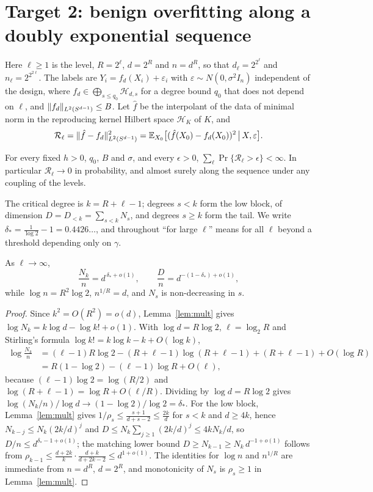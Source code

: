 \section{Target 2: benign overfitting along a doubly exponential sequence}\label{sec:proofT2}

Here $\ell\ge1$ is the level, $R=2^\ell$, $d=2^R$ and $n=d^R$, so that $d_\ell=2^{2^\ell}$ and
$n_\ell=2^{2^{2\ell}}$. The labels are $Y_i=f_d(X_i)+\varepsilon_i$ with $\varepsilon\sim N(0,\sigma^2I_n)$
independent of the design, where $f_d\in\bigoplus_{s\le q_0}\mathcal H_{d,s}$ for a degree bound $q_0$ that
does not depend on $\ell$, and $\|f_d\|_{L^2(S^{d-1})}\le B$. Let $\hat f$ be the interpolant of the data of
minimal norm in the reproducing kernel Hilbert space $\mathcal H_K$ of $K$, and
\[
\mathcal R_\ell=\|\hat f-f_d\|_{L^2(S^{d-1})}^2=\mathbb{E}_{X_0}\big[(\hat f(X_0)-f_d(X_0))^2\,\big|\,X,\varepsilon\big].
\]

\begin{theorem}[Target 2]\label{thm:T2}
For every fixed $h>0$, $q_0$, $B$ and $\sigma$, and every $\epsilon>0$, $\sum_\ell\Pr\{\mathcal R_\ell>\epsilon\}<\infty$.
In particular $\mathcal R_\ell\to0$ in probability, and almost surely along the sequence under any coupling of
the levels.
\end{theorem}

The critical degree is $k=R+\ell-1$; degrees $s<k$ form the low block, of dimension
$D=D_{<k}=\sum_{s<k}N_s$, and degrees $s\ge k$ form the tail. We write $\delta_*=\frac1{\log2}-1=0.4426\ldots$,
and throughout ``for large $\ell$'' means for all $\ell$ beyond a threshold depending only on $\gamma$.

\begin{lemma}\label{lem:scales}
As $\ell\to\infty$,
\[
\frac{N_k}{n}=d^{\,\delta_*+o(1)},\qquad \frac{D}{n}=d^{-(1-\delta_*)+o(1)},
\]
while $\log n=R^2\log2$, $n^{1/R}=d$, and $N_s$ is non-decreasing in $s$.
\end{lemma}

\begin{proof}
Since $k^2=O(R^2)=o(d)$, Lemma~\ref{lem:mult} gives $\log N_k=k\log d-\log k!+o(1)$. With
$\log d=R\log2$, $\ell=\log_2R$ and Stirling's formula $\log k!=k\log k-k+O(\log k)$,
\[
\begin{aligned}
\log\frac{N_k}{n}&=(\ell-1)R\log2-(R+\ell-1)\log(R+\ell-1)+(R+\ell-1)+O(\log R)\\
&=R(1-\log2)-(\ell-1)\log R+O(\ell),
\end{aligned}
\]
because $(\ell-1)\log2=\log(R/2)$ and $\log(R+\ell-1)=\log R+O(\ell/R)$. Dividing by $\log d=R\log2$
gives $\log(N_k/n)/\log d\to(1-\log2)/\log2=\delta_*$. For the low block, Lemma~\ref{lem:mult} gives
$1/\rho_s\le\frac{s+1}{d+s-2}\le\frac{2k}{d}$ for $s<k$ and $d\ge4k$, hence $N_{k-j}\le N_k(2k/d)^j$ and
$D\le N_k\sum_{j\ge1}(2k/d)^j\le4kN_k/d$, so $D/n\le d^{\delta_*-1+o(1)}$; the matching lower bound
$D\ge N_{k-1}\ge N_k\,d^{-1+o(1)}$ follows from $\rho_{k-1}\le\frac{d+2k}{k}\cdot\frac{d+k}{d+2k-2}\le d^{1+o(1)}$.
The identities for $\log n$ and $n^{1/R}$ are immediate from $n=d^R$, $d=2^R$, and monotonicity of $N_s$
is $\rho_s\ge1$ in Lemma~\ref{lem:mult}.
\end{proof}


